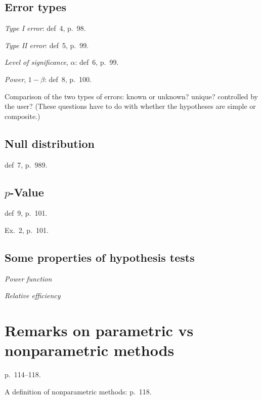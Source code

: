 \documentclass[12pt]{article}
\begin{document}
\subsection{Error types}

\emph{Type I error}: def~4, p.~98.

\emph{Type II error}: def~5, p.~99.

\emph{Level of significance}, $\alpha$: def~6, p.~99.

\emph{Power}, $1-\beta$: def~8, p.~100.

Comparison of the two types of errors:
known or unknown? unique? controlled by the user?
(These questions have to do with whether the hypotheses are simple or
composite.)


\subsection{Null distribution}

def~7, p.~989.

\subsection{$p$-Value}

def~9, p.~101.

\example Ex.~2, p.~101.


\subsection{Some properties of hypothesis tests}

\emph{Power function}

\emph{Relative efficiency}

\section{Remarks on parametric vs nonparametric methods}

p.~114--118.

A definition of nonparametric methods: p.~118.
\end{document}
